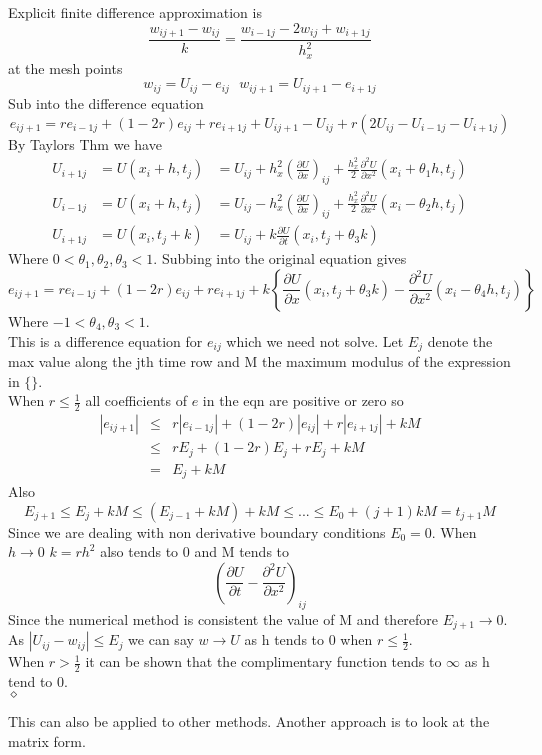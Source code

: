 \begin{example}
Explicit finite difference approximation is 
\[ \frac{w_{ij+1}-w_{ij}}{k} = \frac{w_{i-1j}-2w_{ij}+w_{i+1j}}{h^2_x}
\]
at the mesh points 
\[w_{ij}=U_{ij}-e_{ij} \ \ \ w_{ij+1}=U_{ij+1}-e_{i+1j} \]
Sub into the difference equation
\[e_{ij+1}=re_{i-1j}+(1-2r)e_{ij}+re_{i+1j}+U_{ij+1}-U_{ij}+r(2U_{ij}-U_{i-1j}-U_{i+1j})\]
By Taylors Thm we have
\begin{eqnarray*}
U_{i+1j}&=U(x_i+h,t_j)&=U_{ij}+h_x^2\left( \frac{\partial U}{\partial x}\right)_{ij}+\frac{h_x^2}{2} \frac{\partial^2 U}{\partial x^2}(x_i+\theta_1h,t_j) \\
U_{i-1j}&=U(x_i+h,t_j)&=U_{ij}-h_x^2\left( \frac{\partial U}{\partial x}\right)_{ij}+\frac{h_x^2}{2} \frac{\partial^2 U}{\partial x^2}(x_i-\theta_2h,t_j) \\
U_{i+1j}&=U(x_i,t_j+k)&=U_{ij}+k\frac{\partial U}{\partial t}(x_i,t_j+\theta_3k) 
\end{eqnarray*}
Where $0<\theta_1,    \theta_2,    \theta_3    <1$. Subbing into the original equation gives
\[e_{ij+1}=re_{i-1j}+(1-2r)e_{ij}+re_{i+1j}
+k\left\{\frac{\partial U}{\partial x}(x_i,t_j+\theta_3k) 
 -\frac{\partial^2 U}{\partial x^2}(x_i-\theta_4h,t_j) \right\}
\]
Where $-1<\theta_4,\theta_3<1$.\\
This is a difference equation for $e_{ij}$ which we need not solve. Let $E_{j}$ denote the max value along the jth time row and M the maximum modulus of the expression in $\{\}$.\\
When $r \leq \frac{1}{2}$ all coefficients of $e$ in the eqn are positive or
zero so
\begin{eqnarray*}
|e_{ij+1}| &\leq & r|e_{i-1j}|+(1-2r)|e_{ij}|+r|e_{i+1j}|+kM\\
 &\leq & rE_{j}+(1-2r)E_{j}+rE_{j}+kM\\
&=&E_j+kM
\end{eqnarray*}
Also
\[E_{j+1}\leq E_{j}+kM\leq(E_{j-1}+kM)+kM \leq ... \leq E_0 +(j+1)kM=t_{j+1}M\]
Since we are dealing with non derivative boundary conditions $E_0=0$.
When $h\rightarrow 0$ $k=rh^2$ also tends to 0 and M tends to
\[\left(
\frac{\partial U}{\partial t} - \frac{\partial^2 U}{\partial x^2}\right)_{ij}
 \]
Since the numerical method is consistent the value of M and therefore $E_{j+1}\rightarrow 0$.\\
As $|U_{ij}-w_{ij}|\leq E_j$ we can say $w\rightarrow U$ as h tends to 0 when
$r\leq \frac{1}{2}$.\\
When $r>\frac{1}{2}$ it can be shown that the complimentary function tends to
$\infty$ as h tend to 0.\\
$\diamond$\\
\end{example}
This can also be applied to other methods.  Another approach is to look at the matrix form.
